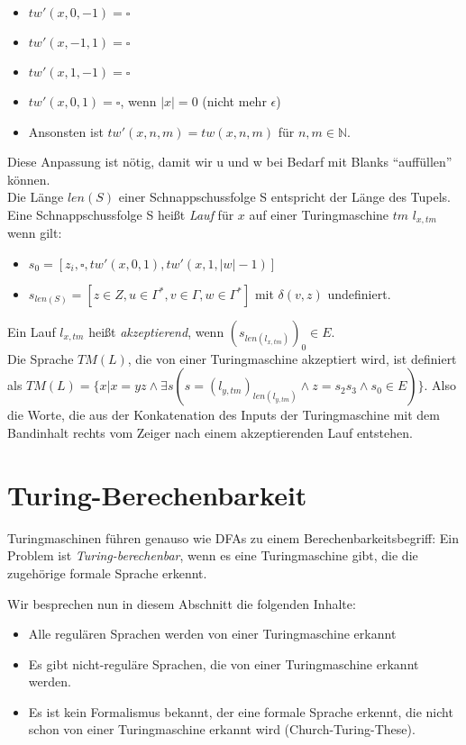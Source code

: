 \begin{itemize}
    \item $tw'(x, 0, -1) = \square$
    \item $tw'(x, -1, 1) = \square$
    \item $tw'(x, 1, -1) = \square$
    \item $tw'(x, 0, 1) = \square$, wenn $|x| = 0$ (nicht mehr $\epsilon$)
    \item Ansonsten ist $tw'(x, n, m) = tw(x, n, m)$ für $n, m \in \mathbb{N}$.
\end{itemize}
Diese Anpassung ist nötig, damit wir u und w bei Bedarf mit Blanks ``auffüllen'' können.
\\

\noindent
Die Länge $len(S)$ einer Schnappschussfolge S entspricht der Länge des Tupels.
\\

\noindent
Eine Schnappschussfolge S heißt
\emph{Lauf} für $x$ auf einer Turingmaschine $tm$ $l_{x, tm}$
wenn gilt:
\begin{itemize}
    \item $s_0 = [z_i, \square, tw'(x,0,1), tw'(x,1,|w|-1)]$
    \item $s_{len(S)} = [z \in Z, u \in \Gamma^*, v \in \Gamma, w \in \Gamma^*]$
        mit $\delta(v, z)$ undefiniert.
\end{itemize}

\noindent
Ein Lauf $l_{x, tm}$ heißt \emph{akzeptierend},
wenn $(s_{len(l_{x, tm})})_0 \in E$.
\\

\noindent
Die Sprache $TM(L)$, die von einer Turingmaschine akzeptiert wird, ist definiert als
$TM(L) = 
\{x|
    x = yz 
    \wedge 
        \exists s(
            s = (l_{y,tm})_{len(l_{y,tm})} 
            \wedge z = s_2s_3
            \wedge s_0 \in E
        )
\}$.
Also die Worte,
die aus der Konkatenation des Inputs der Turingmaschine
mit dem Bandinhalt rechts vom Zeiger nach einem akzeptierenden Lauf entstehen.

\section{Turing-Berechenbarkeit}

Turingmaschinen führen genauso wie DFAs zu einem Berechenbarkeitsbegriff:
Ein Problem ist \emph{Turing-berechenbar},
wenn es eine Turingmaschine gibt,
die die zugehörige formale Sprache erkennt.

Wir besprechen nun in diesem Abschnitt die folgenden Inhalte:
\begin{itemize}
    \item Alle regulären Sprachen werden von einer Turingmaschine erkannt
    \item Es gibt nicht-reguläre Sprachen, die von einer Turingmaschine erkannt werden.
    \item Es ist kein Formalismus bekannt, der eine formale Sprache erkennt,
        die nicht schon von einer Turingmaschine erkannt wird (Church-Turing-These).
\end{itemize}

